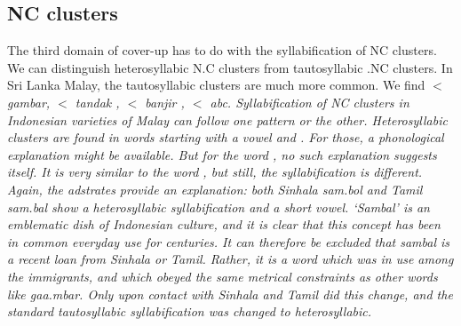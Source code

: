 \documentclass[a4paper,10pt]{article}
\begin{document}
\subsection{NC clusters} 
The third domain of cover-up has to do with the syllabification of NC clusters. We can distinguish heterosyllabic N.C clusters from tautosyllabic .NC clusters. In Sri Lanka Malay, the tautosyllabic clusters are much more common. We find  
$<$ \em gambar\em, 
 $<$ \em tandak \em, 
 $<$ \em banjir \em, 
 $<$ \em abc\em. Syllabification of NC clusters in Indonesian varieties of Malay can follow one pattern or the other. Heterosyllabic clusters are found in words starting with a vowel  and . For those, a phonological explanation might be available. But for the word , no such explanation suggests itself. It is very similar to the word , but still, the syllabification is different. Again, the
adstrates provide an explanation: both Sinhala \em sam.bol \em and Tamil \em sam.bal \em show a heterosyllabic syllabification and a short vowel. `Sambal' is an emblematic dish of Indonesian culture, and it is clear that this concept has been in common everyday use for centuries. It can therefore be excluded that \em sambal \em is a recent loan from Sinhala or Tamil. Rather, it is a word which was in use among the immigrants, and which obeyed the same metrical constraints as other words like \em gaa.mbar\em. Only upon contact with Sinhala and Tamil did this change, and the standard tautosyllabic syllabification was changed to heterosyllabic.
\end{document}

